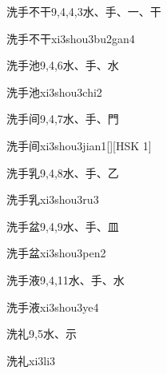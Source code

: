 \begin{Entry}{洗手不干}{9,4,4,3}{⽔、⼿、⼀、⼲}
  \begin{Phonetics}{洗手不干}{xi3shou3bu2gan4}
  \end{Phonetics}
\end{Entry}

\begin{Entry}{洗手池}{9,4,6}{⽔、⼿、⽔}
  \begin{Phonetics}{洗手池}{xi3shou3chi2}
  \end{Phonetics}
\end{Entry}

\begin{Entry}{洗手间}{9,4,7}{⽔、⼿、⾨}
  \begin{Phonetics}{洗手间}{xi3shou3jian1}[][HSK 1]
  \end{Phonetics}
\end{Entry}

\begin{Entry}{洗手乳}{9,4,8}{⽔、⼿、⼄}
  \begin{Phonetics}{洗手乳}{xi3shou3ru3}
  \end{Phonetics}
\end{Entry}

\begin{Entry}{洗手盆}{9,4,9}{⽔、⼿、⽫}
  \begin{Phonetics}{洗手盆}{xi3shou3pen2}
  \end{Phonetics}
\end{Entry}

\begin{Entry}{洗手液}{9,4,11}{⽔、⼿、⽔}
  \begin{Phonetics}{洗手液}{xi3shou3ye4}
  \end{Phonetics}
\end{Entry}

\begin{Entry}{洗礼}{9,5}{⽔、⽰}
  \begin{Phonetics}{洗礼}{xi3li3}
  \end{Phonetics}
\end{Entry}

